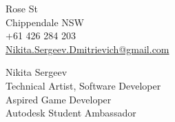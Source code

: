 \documentclass[]{cv-class}
\begin{document}
\thispagestyle{empty}

\begin{minipage}[t]{0.3\textwidth}
\vfill
Rose St \\ Chippendale NSW \\
+61 426 284 203 \\
\href{mailto:Nikita.Sergeev.Dmitrievich+CV@gmail.com}
    {Nikita.Sergeev.Dmitrievich@gmail.com}
\end{minipage}
\hfill
\begin{minipage}[t]{0.65\textwidth}
\begin{flushright}
    {\Huge
        \textcolor{candidate_name_col}{Nikita Sergeev} 
    } \\
    {\large Technical Artist, Software Developer \\ Aspired Game Developer} \\
    \vspace{4pt}
    Autodesk Student Ambassador
\end{flushright}
\end{minipage}

\vspace{4mm}

\bigSeparator{2pt}
\end{document}
